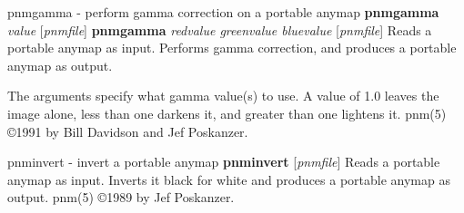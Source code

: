 \newpage
%

pnmgamma - perform gamma correction on a portable anymap
{\bf pnmgamma}
{\it value}
{\rm [}{\it pnmfile}{\rm ]}
\nwl
{\bf pnmgamma}
{\it redvalue greenvalue bluevalue}
{\rm [}{\it pnmfile}{\rm ]}
Reads a portable anymap as input.
Performs gamma correction,
and produces a portable anymap as output.
\par
The arguments specify what gamma value(s) to use.
A value of 1.0 leaves the image alone, less than one darkens it,
and greater than one lightens it.
pnm(5)
\copyright 1991 by Bill Davidson and Jef Poskanzer.
%
 
%

\newpage
%

pnminvert - invert a portable anymap
{\bf pnminvert}
{\rm [}{\it pnmfile}{\rm ]}
Reads a portable anymap as input.
Inverts it black for white and produces a portable anymap as output.
pnm(5)
\copyright 1989 by Jef Poskanzer.
%
 
